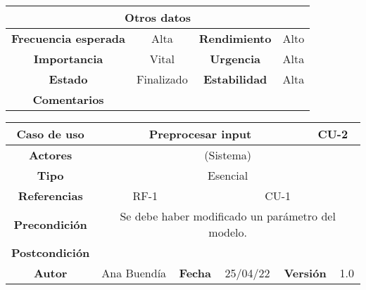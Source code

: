 \begin{table}[!h]
\begin{tabular}{|c|c|c|c|}
\hline
\multicolumn{4}{|c|}{\cellcolor{cyan} \textbf{Otros datos}} \\
\hline
 \cellcolor{cyan} \textbf{Frecuencia esperada}             &     Alta          &    \cellcolor{cyan} \textbf{Rendimiento}          &      Alto        \\
\hline
 \cellcolor{cyan} \textbf{Importancia}             &      Vital         &     \cellcolor{cyan} \textbf{Urgencia}         &      Alta        \\
\hline
 \cellcolor{cyan} \textbf{Estado}             &      Finalizado         &    \cellcolor{cyan} \textbf{Estabilidad}          &     Alta         \\
\hline
 \cellcolor{cyan} \textbf{Comentarios}        &  \multicolumn{3}{|c|}{} \\
\hline
\end{tabular}
\end{table}





\clearpage

\begin{table}[!h]
\begin{tabular}{|c|c|c|c|c|c|c|c|}
\hline
\rowcolor{cyan} \textbf{Caso de uso} & \multicolumn{5}{|c|}{Preprocesar input} & \multicolumn{2}{|c|}{CU-2} \\
\hline
\cellcolor{cyan} \textbf{Actores}              & \multicolumn{7}{|c|}{(Sistema)}           \\
\hline
\cellcolor{cyan} \textbf{Tipo}                 & \multicolumn{7}{|c|}{Esencial}             \\
\hline
\cellcolor{cyan} \textbf{Referencias}          & \multicolumn{2}{|c|}{RF-1}           & \multicolumn{5}{|c|}{CU-1}\\
\hline
\cellcolor{cyan} \textbf{Precondición}         & \multicolumn{7}{|c|}{Se debe haber modificado un parámetro del modelo.}             \\
\hline
\cellcolor{cyan} \textbf{Postcondición}        & \multicolumn{7}{|c|}{}              \\
\hline
\cellcolor{cyan} \textbf{Autor}                &   Ana Buendía   & \multicolumn{2}{|c|}{\cellcolor{cyan} \textbf{Fecha}} &  25/04/22   & \multicolumn{2}{|c|}{\cellcolor{cyan} \textbf{Versión}} & 1.0  \\
\hline
\end{tabular}
\end{table}

